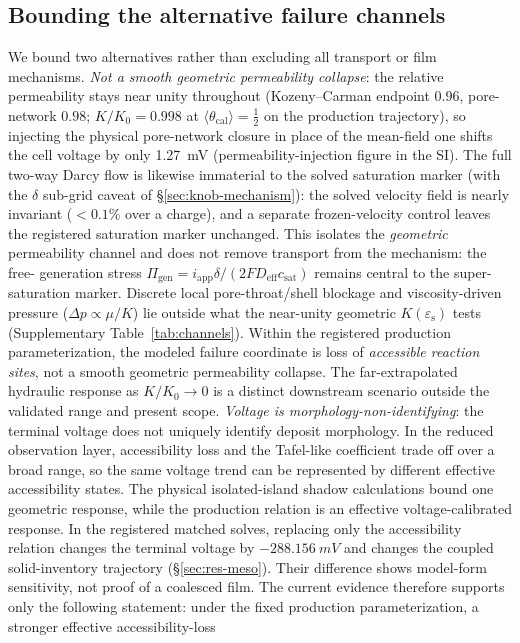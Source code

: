 \documentclass[11pt]{article}
\newcommand{\csat}{c_{\mathrm{sat}}}
\newcommand{\epss}{\varepsilon_{\mathrm{s}}}
\newcommand{\iapp}{i_{\mathrm{app}}}
\newcommand{\Deff}{D_{\mathrm{eff}}}
\newcommand{\thetacal}{\theta_{\mathrm{cal}}}
\begin{document}
\subsection{Bounding the alternative failure channels}
\label{sec:perm}
We bound two alternatives rather than excluding all transport or film mechanisms. \emph{Not a smooth
geometric permeability collapse}: the
relative permeability stays near unity throughout (Kozeny--Carman endpoint $0.96$, pore-network $0.98$;
$K/K_0=0.998$ at $\langle\thetacal\rangle{=}\tfrac12$ on the production trajectory), so injecting the physical pore-network closure in place of the
mean-field one shifts the cell voltage by only \SI{1.27}{mV} (permeability-injection figure in the SI). The full two-way
Darcy flow is likewise immaterial to the solved saturation marker (with the $\delta$ sub-grid caveat of
\S\ref{sec:knob-mechanism}): the solved velocity field is nearly invariant ($<\!0.1\%$ over a charge), and a
separate frozen-velocity control leaves the registered saturation marker unchanged. This isolates the
\emph{geometric} permeability channel and does not remove transport from
the mechanism: the free- generation stress $\Pi_{\mathrm{gen}}=\iapp\delta/(2F\Deff\csat)$ remains
central to the super-saturation marker. Discrete local pore-throat/shell blockage and viscosity-driven
pressure ($\Delta p\propto\mu/K$) lie outside what the near-unity geometric $K(\epss)$ tests
(Supplementary Table~\ref{tab:channels}). Within the registered production parameterization, the modeled
failure coordinate is loss of \emph{accessible reaction sites}, not a smooth geometric permeability collapse.
The far-extrapolated hydraulic response as $K/K_0\!\to\!0$ is a distinct downstream scenario outside the
validated range and present scope. \emph{Voltage is morphology-non-identifying}:
the terminal voltage does not uniquely identify deposit morphology. In the reduced observation layer,
accessibility loss and the Tafel-like coefficient trade off over a broad range, so the same voltage trend can
be represented by different effective accessibility states. The physical isolated-island shadow calculations
bound one geometric response, while the production relation is an effective voltage-calibrated response. In
the registered matched solves, replacing only the accessibility relation changes the terminal voltage by
$-\SI{288.156}{mV}$ and changes the coupled solid-inventory trajectory (\S\ref{sec:res-meso}). Their difference
shows model-form sensitivity, not proof of a coalesced film. The current evidence therefore supports only the
following statement: under the fixed production parameterization, a stronger effective accessibility-loss
\end{document}
